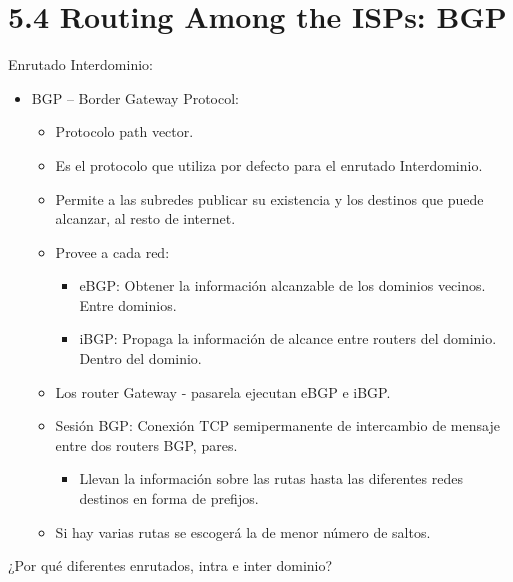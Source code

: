 \documentclass[12pt, twoside, openright]{report} %
\begin{document}
\pagebreak
\section{5.4 Routing Among the ISPs: BGP}

Enrutado Interdominio:

\begin{itemize}
	\item BGP -- Border Gateway Protocol:

	      \begin{itemize}
		      \item Protocolo path vector.
		      \item Es el protocolo que utiliza por defecto para el enrutado
		            Interdominio.
		      \item Permite a las subredes publicar su existencia y los destinos que
		            puede alcanzar, al resto de internet.
		      \item Provee a cada red:

		            \begin{itemize}
			            \item eBGP: Obtener la información alcanzable de los dominios
			                  vecinos. Entre dominios.
			            \item iBGP: Propaga la información de alcance entre routers del
			                  dominio. Dentro del dominio.
		            \end{itemize}
		      \item Los router Gateway - pasarela ejecutan eBGP e iBGP.
		      \item Sesión BGP: Conexión TCP semipermanente de intercambio de
		            mensaje entre dos routers BGP, pares.

		            \begin{itemize}
			            \item Llevan la información sobre las rutas hasta las diferentes
			                  redes destinos en forma de prefijos.
		            \end{itemize}
		      \item Si hay varias rutas se escogerá la de menor número de saltos.
	      \end{itemize}
\end{itemize}

¿Por qué diferentes enrutados, intra e inter dominio?
\end{document}
